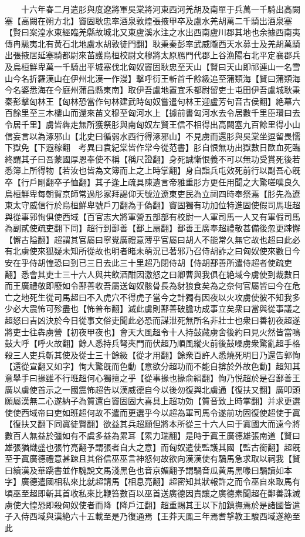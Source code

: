 　　十六年春二月遣肜與度遼將軍吳棠將河東西河羌胡及南單于兵萬一千騎出高闕塞【高闕在朔方北】竇固耿忠率酒泉敦煌張掖甲卒及盧水羌胡萬二千騎出酒泉塞【賢曰案湟水東經臨羌縣故城北又東盧溪水注之水出西南盧川郡其地也余據西南夷傳冉駹夷北有黄石北地盧水胡敦徒門翻】耿秉秦彭率武威隴西天水募士及羌胡萬騎出張掖居延塞騎都尉來苖護烏桓校尉文穆將太原鴈門代郡上谷漁陽右北平定襄郡兵及烏桓鮮卑萬一千騎出平城塞伐北匈奴竇固耿忠至天山【賢曰天山即祁連山一名雪山今名折羅漢山在伊州北漢一作漫】撃呼衍王斬首千餘級追至蒲類海【賢曰蒲類海今名婆悉海在今庭州蒲昌縣東南】取伊吾盧地置宜禾都尉留吏士屯田伊吾盧城耿秉秦彭擊匈林王【匈林恐當作句林建武時匈奴嘗遣句林王迎盧芳句音古侯翻】絶幕六百餘里至三木樓山而還來苖文穆至匈河水上【據前書匈河水去令居數千里臣瓚曰去令居千里】虜皆犇走無所獲祭肜與南匈奴左賢王信不相得出高闕塞九百餘里得小山信妄言以為涿邪山【北史曰循弱水西行得涿邪山】不見虜而還肜與吳棠坐逗留畏懦下獄免【下遐稼翻　考異曰袁紀棠皆作常今從范書】肜自恨無功出獄數日歐血死臨終謂其子曰吾蒙國厚恩奉使不稱【稱尺證翻】身死誠慚恨義不可以無功受賞死後若悉簿上所得物【若汝也皆為文簿而上之上時掌翻】身自詣兵屯效死前行以副吾心旣卒【行戶剛翻卒子恤翻】其子逢上疏具陳遺言帝雅重肜方更任用聞之大驚嗟嘆良久烏桓鮮卑每朝賀京師常過肜冢拜謁仰天號泣遼東吏民為立祠四時奉祭焉【肜先為遼東太守威信行於烏桓鮮卑號戶刀翻為于偽翻】竇固獨有功加位特進固使假司馬班超與從事郭恂俱使西域【百官志大將軍營五部部有校尉一人軍司馬一人又有軍假司馬為副貳使疏吏翻下同】超行到鄯善【鄯上扇翻】鄯善王廣奉超禮敬甚備後忽更踈懈【懈古隘翻】超謂其官屬曰寧覺廣禮意薄乎官屬曰胡人不能常久無它故也超曰此必有北虜使來狐疑未知所從故也明者睹未萌況已著邪乃召侍胡詐之曰匈奴使來數日今安在乎侍胡惶恐曰到已三日去此三十里超乃閉侍胡【侍胡鄯善所遣侍超者使疏吏翻】悉會其吏士三十六人與共飲酒酣因激怒之曰卿曹與我俱在絶域今虜使到裁數日而王廣禮敬即廢如令鄯善收吾屬送匈奴骸骨長為豺狼食矣為之奈何官屬皆曰今在危亡之地死生從司馬超曰不入虎穴不得虎子當今之計獨有因夜以火攻虜使彼不知我多少必大震怖可殄盡也【怖普布翻】滅此虜則鄯善破膽功成事立矣衆曰當與從事議之超怒曰吉凶決於今日從事文俗吏聞此必恐而謀泄死無所名非壯士也衆曰善初夜超遂將吏士往犇虜營【初夜甲夜也】會天大風超令十人持鼔藏虜舍後約曰見火然皆當鳴鼔大呼【呼火故翻】餘人悉持兵弩夾門而伏超乃順風縱火前後鼔噪虜衆驚亂超手格殺三人吏兵斬其使及從士三十餘級【從才用翻】餘衆百許人悉燒死明日乃還告郭恂【還從宣翻又如字】恂大驚旣而色動【意欲分超功而不能自揜於外故色動】超知其意舉手曰掾雖不行班超何心獨擅之乎【從事掾也掾俞絹翻】恂乃悦超於是召鄯善王廣以虜使首示之一國震怖超告以漢威德自今以後勿復與北虜通【復扶又翻】廣叩頭願屬漢無二心遂納子為質還白竇固固大喜具上超功効【質音致上時掌翻】并求更選使使西域帝曰吏如班超何故不遣而更選乎今以超為軍司馬令遂前功固復使超使于寘【復扶又翻下同寘徒賢翻】欲益其兵超願但將本所從三十六人曰于寘國大而遠今將數百人無益於彊如有不虞多益為累耳【累力瑞翻】是時于寘王廣德雄張南道【賢曰雄張猶熾盛也張竹亮翻予謂張者自大之意】而匈奴遣使監護其國【監古銜翻】超旣至于寘廣德禮意甚踈且其俗信巫巫言神怒何故欲向漢漢使有騧馬急求取以祠我【賢曰續漢及華蹻書並作騩說文馬淺黑色也音京媚翻予謂騧音瓜黄馬黑喙曰騧讀如本字】廣德遣國相私來比就超請馬【相息亮翻】超密知其狀報許之而令巫自來取馬有頃巫至超即斬其首收私來比鞭笞數百以巫首送廣德因責讓之廣德素聞超在鄯善誅滅虜使大惶恐即殺匈奴使者而降【降戶江翻】超重賜其王以下加鎮撫焉於是諸國皆遣子入侍西域與漢絶六十五載至是乃復通焉【王莽天鳳三年焉耆撃教王駿西域遂絶至此